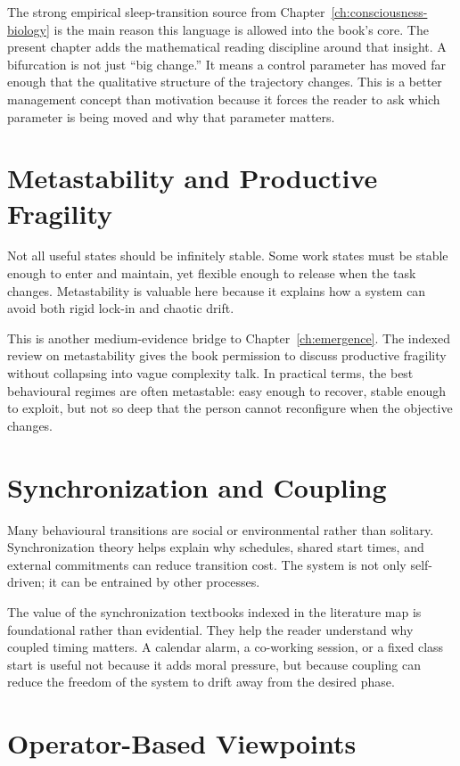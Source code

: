 The strong empirical sleep-transition source from Chapter~\ref{ch:consciousness-biology}
is the main reason this language is allowed into the book's core. The present
chapter adds the mathematical reading discipline around that insight. A
bifurcation is not just ``big change.'' It means a control parameter has moved
far enough that the qualitative structure of the trajectory changes. This is a
better management concept than motivation because it forces the reader to ask
which parameter is being moved and why that parameter matters.

\section{Metastability and Productive Fragility}

Not all useful states should be infinitely stable. Some work states must be
stable enough to enter and maintain, yet flexible enough to release when the
task changes. Metastability is valuable here because it explains how a system
can avoid both rigid lock-in and chaotic drift.

This is another medium-evidence bridge to Chapter~\ref{ch:emergence}. The
indexed review on metastability gives the book permission to discuss productive
fragility without collapsing into vague complexity talk. In practical terms,
the best behavioural regimes are often metastable: easy enough to recover,
stable enough to exploit, but not so deep that the person cannot reconfigure
when the objective changes.

\section{Synchronization and Coupling}

Many behavioural transitions are social or environmental rather than solitary.
Synchronization theory helps explain why schedules, shared start times, and
external commitments can reduce transition cost. The system is not only
self-driven; it can be entrained by other processes.

The value of the synchronization textbooks indexed in the literature map is
foundational rather than evidential. They help the reader understand why
coupled timing matters. A calendar alarm, a co-working session, or a fixed
class start is useful not because it adds moral pressure, but because coupling
can reduce the freedom of the system to drift away from the desired phase.

\section{Operator-Based Viewpoints}

